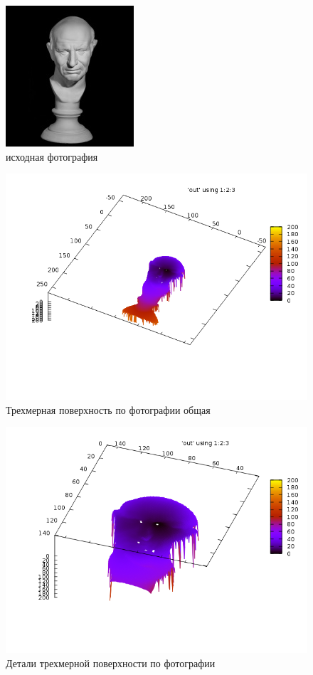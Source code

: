 \begin{figure}[H]
  \centering
  \includegraphics[width=0.5\linewidth]{img/man_in.jpg}
  \hfil \caption{исходная фотография}
  \label{fig:ex:4:in}
\end{figure}

\begin{figure}[H]
  \centering
  \includegraphics[width=0.5\linewidth]{img/man_all.png}
  \hfil \caption{Трехмерная поверхность по фотографии общая}
  \label{fig:ex:4:out1}
\end{figure}

\begin{figure}[H]
  \centering
  \includegraphics[width=0.5\linewidth]{img/man_detail.png}
  \hfil \caption{Детали трехмерной поверхности по фотографии }
  \label{fig:ex:4:out2}
\end{figure}


